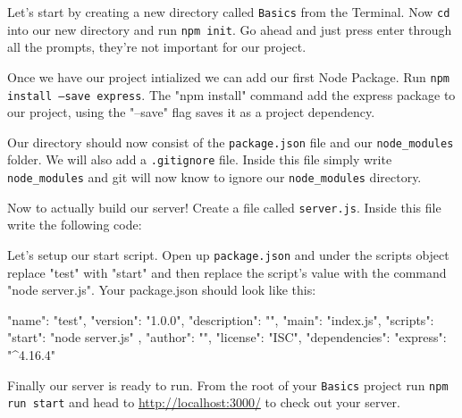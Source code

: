\documentclass{42-en}
\begin{document}
	Let's start by creating a new directory called \texttt{Basics} from the Terminal. Now \texttt{cd} into our new directory and run \texttt{npm init}. Go ahead and just press enter through all the prompts, they're not important for our project.

	Once we have our project intialized we can add our first Node Package. Run \texttt{npm install --save express}. The "npm install" command add the express package to our project, using the "--save" flag saves it as a project dependency.
	
	Our directory should now consist of the \texttt{package.json} file and our \texttt{node\_modules} folder. We will also add a \texttt{.gitignore} file. Inside this file simply write \texttt{node\_modules} and git will now know to ignore our \texttt{node\_modules} directory.
	
	Now to actually build our server! Create a file called \texttt{server.js}. Inside this file write the following code:
	

	Let's setup our start script. Open up \texttt{package.json} and under the scripts object replace "test" with "start" and then replace the script's value with the command "node server.js". Your package.json should look like this: 
	\begin{42jscode}
	{
		"name": "test",
		"version": "1.0.0",
		"description": "",
		"main": "index.js",
		"scripts": {
			"start": "node server.js"
		},
		"author": "",
		"license": "ISC",
		"dependencies": {
			"express": "^4.16.4"
		}
	}
	\end{42jscode}


	Finally our server is ready to run. From the root of your \texttt{Basics} project run \texttt{npm run start} and head to \href{http://localhost:3000/}{http://localhost:3000/} to check out your server.


\end{document}
